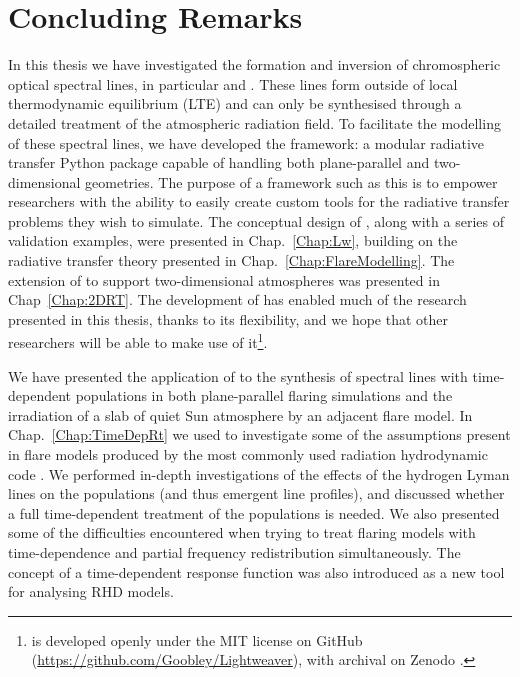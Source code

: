 \chapter{Concluding Remarks}\label{Chap:Conclusions}

In this thesis we have investigated the formation and inversion of chromospheric optical spectral lines, in particular \Ha{} and \CaLine{}.
These lines form outside of local thermodynamic equilibrium (LTE) and can only be synthesised through a detailed treatment of the atmospheric radiation field.
To facilitate the modelling of these spectral lines, we have developed the \Lw{} framework: a modular radiative transfer Python package capable of handling both plane-parallel and two-dimensional geometries.
The purpose of a framework such as this is to empower researchers with the ability to easily create custom tools for the radiative transfer problems they wish to simulate.
The conceptual design of \Lw{}, along with a series of validation examples, were presented in Chap.~\ref{Chap:Lw}, building on the radiative transfer theory presented in Chap.~\ref{Chap:FlareModelling}.
The extension of \Lw{} to support two-dimensional atmospheres was presented in Chap~\ref{Chap:2DRT}.
The development of \Lw{} has enabled much of the research presented in this thesis, thanks to its flexibility, and we hope that other researchers will be able to make use of it\footnote{\Lw{} \citep{Osborne2021} is developed openly under the MIT license on GitHub (\url{https://github.com/Goobley/Lightweaver}), with archival on Zenodo \citep{LightweaverZenodo}.}.

We have presented the application of \Lw{} to the synthesis of spectral lines with time-dependent populations in both plane-parallel flaring simulations and the irradiation of a slab of quiet Sun atmosphere by an adjacent flare model.
In Chap.~\ref{Chap:TimeDepRt} we used \Lw{} to investigate some of the assumptions present in flare models produced by the most commonly used \Sota{} radiation hydrodynamic code \Radyn{}.
We performed in-depth investigations of the effects of the hydrogen Lyman lines on the \Caii{} populations (and thus emergent line profiles), and discussed whether a full time-dependent treatment of the \Caii{} populations is needed.
We also presented some of the difficulties encountered when trying to treat flaring models with time-dependence and partial frequency redistribution simultaneously.
The concept of a time-dependent response function was also introduced as a new tool for analysing RHD models.

